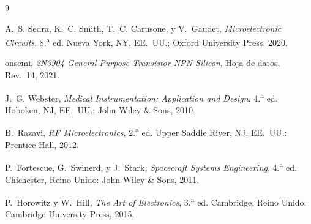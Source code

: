 \documentclass[conference]{IEEEtran}
\begin{document}
\begin{thebibliography}{9}

A.~S. Sedra, K.~C. Smith, T.~C. Carusone, y V.~Gaudet, \emph{Microelectronic Circuits}, 8.\textsuperscript{a} ed. Nueva York, NY, EE.~UU.: Oxford University Press, 2020.

onsemi, \emph{2N3904 General Purpose Transistor NPN Silicon}, Hoja de datos, Rev.~14, 2021.

J.~G. Webster, \emph{Medical Instrumentation: Application and Design}, 4.\textsuperscript{a} ed. Hoboken, NJ, EE.~UU.: John Wiley \& Sons, 2010.

B.~Razavi, \emph{RF Microelectronics}, 2.\textsuperscript{a} ed. Upper Saddle River, NJ, EE.~UU.: Prentice Hall, 2012.

P.~Fortescue, G.~Swinerd, y J.~Stark, \emph{Spacecraft Systems Engineering}, 4.\textsuperscript{a} ed. Chichester, Reino Unido: John Wiley \& Sons, 2011.

P.~Horowitz y W.~Hill, \emph{The Art of Electronics}, 3.\textsuperscript{a} ed. Cambridge, Reino Unido: Cambridge University Press, 2015.

\end{thebibliography}
\end{document}
